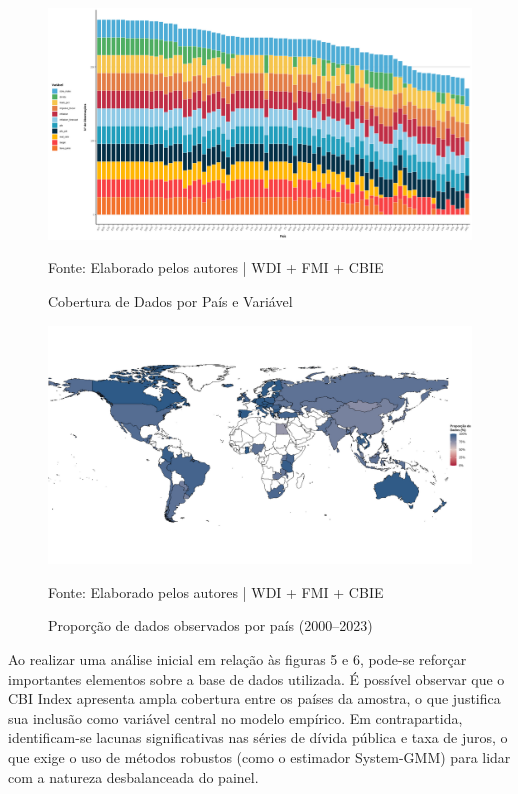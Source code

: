 \documentclass[a4paper,12pt]{article}
\begin{document}
\begin{figure}[H]
    \centering
    \caption{Cobertura de Dados por País e Variável}
    \includegraphics[width=.85\linewidth]{Imagens/paperi4.png}
    \label{fig:observações_absolutas}

    \footnotesize{Fonte: Elaborado pelos autores | WDI + FMI + CBIE}
\end{figure}

\begin{figure}[H]
    \centering
    \caption{Proporção de dados observados por país (2000–2023)}
    \includegraphics[width=.85\linewidth]{Imagens/paperi5.png}
    \label{fig:observações_relativas}

    \footnotesize{Fonte: Elaborado pelos autores | WDI + FMI + CBIE}
\end{figure}

Ao realizar uma análise inicial em relação às figuras 5 e 6, pode-se reforçar importantes elementos sobre a base de dados utilizada. É possível observar que o CBI Index apresenta ampla cobertura entre os países da amostra, o que justifica sua inclusão como variável central no modelo empírico. Em contrapartida, identificam-se lacunas significativas nas séries de dívida pública e taxa de juros, o que exige o uso de métodos robustos (como o estimador System-GMM) para lidar com a natureza desbalanceada do painel.
\end{document}
